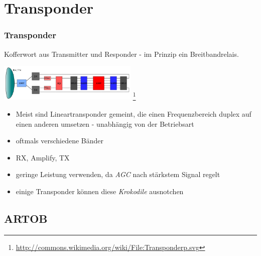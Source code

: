 \section{Transponder}

\begin{frame}
    \frametitle{Transponder}

    Kofferwort aus Transmitter und Responder - im Prinzip ein Breitbandrelais.

    \begin{center}
        \includegraphics[width=0.5\textwidth]{bv11/Transponder.png}
        \footnote{\tiny \url{http://commons.wikimedia.org/wiki/File:Transponderp.svg}}
    \end{center}

    \begin{itemize}
        \item Meist sind Lineartransponder gemeint, die einen Frequenzbereich
              duplex auf einen anderen umsetzen - unabhängig von der Betriebsart
        \item oftmals verschiedene Bänder
        \item RX, Amplify, TX
        \item geringe Leistung verwenden, da \emph{AGC} nach stärkstem Signal regelt
        \item einige Transponder können diese \emph{Krokodile} ausnotchen
    \end{itemize}

\end{frame}

\subsection{ARTOB}

